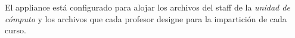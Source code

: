 El appliance est\'{a} configurado para alojar los archivos del staff de la \textit{unidad de c\'{o}mputo} y los archivos que cada profesor designe para la impartici\'{o}n de cada curso.

{
 \begin{table}[H]
 \caption{Limites establecidos en el appliance}{}
 \label{tab:limites-appliance}
 \noindent{} %
 \end{table}
}

